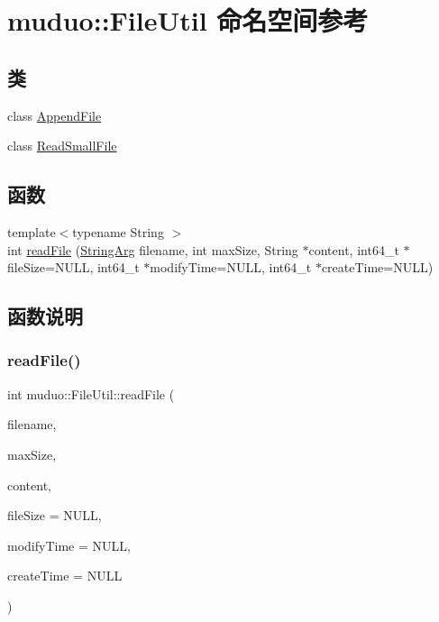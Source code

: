 \hypertarget{namespacemuduo_1_1FileUtil}{}\section{muduo\+:\+:File\+Util 命名空间参考}
\label{namespacemuduo_1_1FileUtil}
\subsection*{类}
\begin{DoxyCompactItemize}
\item 
class \hyperlink{classmuduo_1_1FileUtil_1_1AppendFile}{Append\+File}
\item 
class \hyperlink{classmuduo_1_1FileUtil_1_1ReadSmallFile}{Read\+Small\+File}
\end{DoxyCompactItemize}
\subsection*{函数}
\begin{DoxyCompactItemize}
\item 
{\footnotesize template$<$typename String $>$ }\\int \hyperlink{namespacemuduo_1_1FileUtil_a14a3368f5012ffe7b1004ef5b897fbbe}{read\+File} (\hyperlink{classmuduo_1_1StringArg}{String\+Arg} filename, int max\+Size, String $\ast$content, int64\+\_\+t $\ast$file\+Size=N\+U\+LL, int64\+\_\+t $\ast$modify\+Time=N\+U\+LL, int64\+\_\+t $\ast$create\+Time=N\+U\+LL)
\end{DoxyCompactItemize}


\subsection{函数说明}
\mbox{\label{namespacemuduo_1_1FileUtil_a14a3368f5012ffe7b1004ef5b897fbbe}} 
\subsubsection{\texorpdfstring{read\+File()}{readFile()}}
{\footnotesize\ttfamily int muduo\+::\+File\+Util\+::read\+File (\begin{DoxyParamCaption}\item[{\hyperlink{classmuduo_1_1StringArg}{String\+Arg}}]{filename,  }\item[{int}]{max\+Size,  }\item[{String $\ast$}]{content,  }\item[{int64\+\_\+t $\ast$}]{file\+Size = {\ttfamily NULL},  }\item[{int64\+\_\+t $\ast$}]{modify\+Time = {\ttfamily NULL},  }\item[{int64\+\_\+t $\ast$}]{create\+Time = {\ttfamily NULL} }\end{DoxyParamCaption})}



